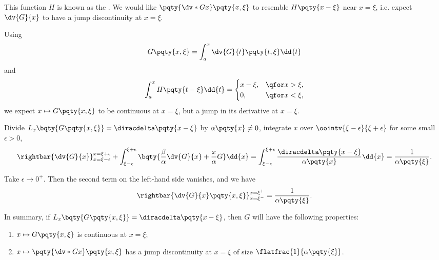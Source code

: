 This function \(H\) is known as the . We would like \(\pqty{\dv*{G}{x}} \pqty{x, \xi}\) to resemble \(H\pqty{x - \xi}\) near \(x = \xi\), i.e. expect \(\dv{G}{x}\) to have a jump discontinuity at \(x = \xi\).

Using
\begin{equation}
    G\pqty{x, \xi} = \int_{a}^{x} \dv{G}{t} \pqty{t, \xi} \dd{t}
\end{equation}
and
\begin{equation}
    \int_{a}^{x} H\pqty{t - \xi} \dd{t} = \begin{cases}
        x - \xi, & \qfor x > \xi, \\
        0, & \qfor x < \xi,
    \end{cases}
\end{equation}
we expect \(x \mapsto G\pqty{x, \xi}\) to be continuous at \(x = \xi\), but a jump in its derivative at \(x = \xi\).

Divide \(L_x \bqty{G\pqty{x, \xi}} = \diracdelta\pqty{x - \xi}\) by \(\alpha\pqty{x} \neq 0\), integrate \(x\) over \(\oointv{\xi - \epsilon}{\xi + \epsilon}\) for some small \(\epsilon > 0\),
\begin{equation}
    \rightbar{\dv{G}{x}}_{x = \xi - \epsilon}^{x = \xi + \epsilon} + \int_{\xi - \epsilon}^{\xi + \epsilon} \bqty{\frac{\beta}{\alpha} \dv{G}{x} + \frac{x}{\alpha} G} \dd{x} = \int_{\xi - \epsilon}^{\xi + \epsilon} \frac{\diracdelta\pqty{x - \xi}}{\alpha \pqty{x}} \dd{x} = \frac{1}{\alpha\pqty{\xi}}.
\end{equation}

Take \(\epsilon \to 0^+\). Then the second term on the left-hand side vanishes, and we have
\begin{equation}
    \rightbar{\dv{G}{x} \pqty{x, \xi}}_{x = \xi^-}^{x = \xi^+} = \frac{1}{\alpha\pqty{\xi}}.
\end{equation}

In summary, if \(L_x\bqty{G\pqty{x, \xi}} = \diracdelta\pqty{x - \xi}\), then \(G\) will have the following properties:
\begin{enumerate}[label=(\roman*)]
    \item \(x \mapsto G\pqty{x, \xi}\) is continuous at \(x = \xi\);
    \item \(x \mapsto \pqty{\dv*{G}{x}} \pqty{x, \xi}\) has a jump discontinuity at \(x = \xi\) of size \(\flatfrac{1}{\alpha\pqty{\xi}}\).
\end{enumerate}

